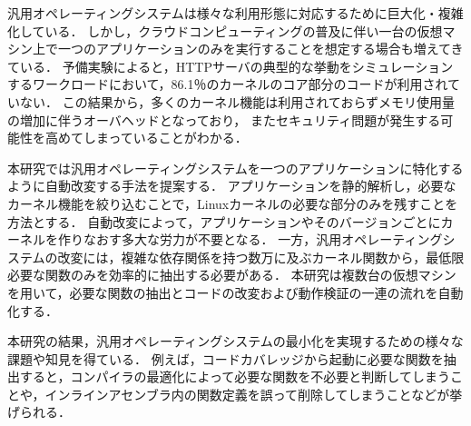 \setlength{\parindent}{12pt}
                                                                         

汎用オペレーティングシステムは様々な利用形態に対応するために巨大化・複雑化している．
しかし，クラウドコンピューティングの普及に伴い一台の仮想マシン上で一つのアプリケーションのみを実行することを想定する場合も増えてきている．
予備実験によると，HTTPサーバの典型的な挙動をシミュレーションするワークロードにおいて，86.1％のカーネルのコア部分のコードが利用されていない．
この結果から，多くのカーネル機能は利用されておらずメモリ使用量の増加に伴うオーバヘッドとなっており，
またセキュリティ問題が発生する可能性を高めてしまっていることがわかる．

本研究では汎用オペレーティングシステムを一つのアプリケーションに特化するように自動改変する手法を提案する．
アプリケーションを静的解析し，必要なカーネル機能を絞り込むことで，Linuxカーネルの必要な部分のみを残すことを方法とする．
自動改変によって，アプリケーションやそのバージョンごとにカーネルを作りなおす多大な労力が不要となる．
一方，汎用オペレーティングシステムの改変には，複雑な依存関係を持つ数万に及ぶカーネル関数から，最低限必要な関数のみを効率的に抽出する必要がある．
本研究は複数台の仮想マシンを用いて，必要な関数の抽出とコードの改変および動作検証の一連の流れを自動化する．

本研究の結果，汎用オペレーティングシステムの最小化を実現するための様々な課題や知見を得ている．
例えば，コードカバレッジから起動に必要な関数を抽出すると，コンパイラの最適化によって必要な関数を不必要と判断してしまうことや，インラインアセンブラ内の関数定義を誤って削除してしまうことなどが挙げられる．
